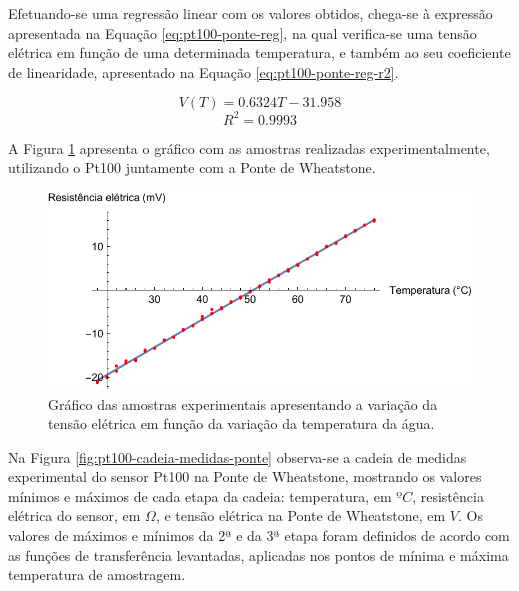 \documentclass[a4paper]{instrumentacao}
\begin{document}
Efetuando-se uma regressão linear com os valores obtidos, chega-se à expressão apresentada na Equação \ref{eq:pt100-ponte-reg}, na qual verifica-se uma tensão elétrica em função de uma determinada temperatura, e também ao seu coeficiente de linearidade, apresentado na Equação \ref{eq:pt100-ponte-reg-r2}.

\begin{equation}
	V(T) = 0.6324T - 31.958
	\label{eq:pt100-ponte-reg}
\end{equation}
\begin{equation}
	R^2=0.9993
	\label{eq:pt100-ponte-reg-r2}
\end{equation}

A Figura \ref{fig:pt100-amostras-ponte} apresenta o gráfico com as amostras realizadas experimentalmente, utilizando o Pt100 juntamente com a Ponte de Wheatstone.

\begin{figure}[H]
\center
\includegraphics[width=\textwidth]{Pt100-Experimental-Bridge.pdf}
\caption{Gráfico das amostras experimentais apresentando a variação da tensão elétrica em função da variação da temperatura da água.}
\label{fig:pt100-amostras-ponte}
\end{figure}

Na Figura \ref{fig:pt100-cadeia-medidas-ponte} observa-se a  cadeia de medidas experimental do sensor Pt100 na Ponte de Wheatstone, mostrando os valores mínimos e máximos de cada etapa da cadeia: temperatura, em $ºC$, resistência elétrica do sensor, em $\Omega$, e tensão elétrica na Ponte de Wheatstone, em $V$. Os valores de máximos e mínimos da 2ª e da 3ª etapa foram definidos de acordo com as funções de transferência levantadas, aplicadas nos pontos de mínima e máxima temperatura de amostragem.
\end{document}

